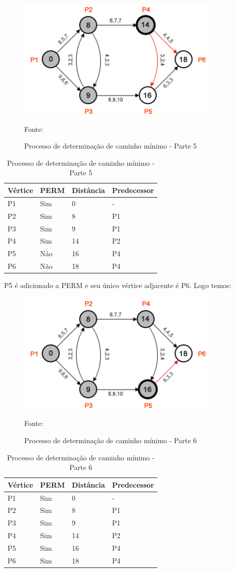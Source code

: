 \begin{figure}[htbp]
\centering
 \includegraphics[width=.50\textwidth]{chapters/fig/leo6.png}
\caption{Processo de determinação de caminho mínimo - Parte 5}
Fonte: \cite{leonard}
\label{fig:leo6}
\end{figure}
\FloatBarrier
\begin{table}[htbp]
	\centering
	\begin{tabular}{l l l l}
	\toprule
	Vértice & PERM & Distância & Predecessor\\
	\midrule
	P1 & Sim & 0 & - \\
	P2 & Sim & 8 & P1 \\
	P3 & Sim & 9 & P1 \\
	P4 & Sim & 14 & P2 \\
	P5 & Não & 16 & P4 \\
	P6 & Não & 18 & P4 \\
	\bottomrule
	\end{tabular}
\caption{Processo de determinação de caminho mínimo - Parte 5}
 \label{tab:leotab5}
\end{table}

P5 é adicionado a PERM e seu único vértice adjacente é P6. Logo temos:

\begin{figure}[htbp]
\centering
 \includegraphics[width=.50\textwidth]{chapters/fig/leo7.png}
\caption{Processo de determinação de caminho mínimo - Parte 6}
Fonte: \cite{leonard}
\label{fig:leo7}
\end{figure}
\FloatBarrier
\begin{table}[htbp]
	\centering
	\begin{tabular}{l l l l}
	\toprule
	Vértice & PERM & Distância & Predecessor\\
	\midrule
	P1 & Sim & 0 & - \\
	P2 & Sim & 8 & P1 \\
	P3 & Sim & 9 & P1 \\
	P4 & Sim & 14 & P2 \\
	P5 & Sim & 16 & P4 \\
	P6 & Sim & 18 & P4 \\
	\bottomrule
	\end{tabular}
\caption{Processo de determinação de caminho mínimo - Parte 6}
 \label{tab:leotab5}
\end{table}

